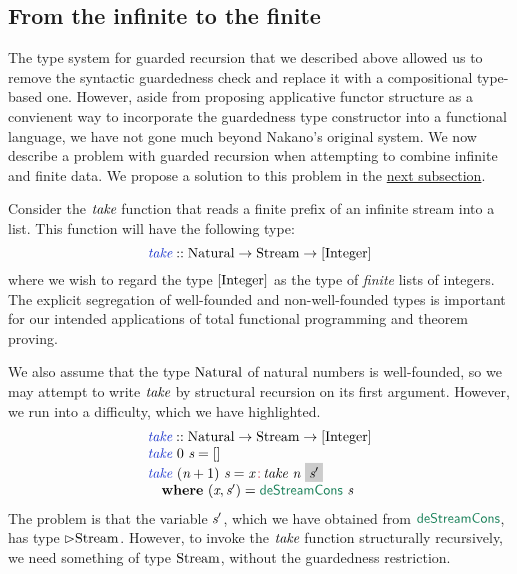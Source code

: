 \subsection{From the infinite to the finite}
\label{sec:infinite-to-finite}

The type system for guarded recursion that we described above allowed
us to remove the syntactic guardedness check and replace it with a
compositional type-based one. However, aside from proposing
applicative functor structure as a convienent way to incorporate the
guardedness type constructor into a functional language, we have not
gone much beyond Nakano's original system. We now describe a problem
with guarded recursion when attempting to combine infinite and finite
data. We propose a solution to this problem in the
\hyperref[sec:clock-vars]{next subsection}.

Consider the $\textit{take}$ function that reads a finite prefix of an
infinite stream into a list. This function will have the following type:
\begin{displaymath}
  \defn{take} :: \tyname{Natural} \to \tyname{Stream} \to [\tyname{Integer}]
\end{displaymath}
where we wish to regard the type $[\textrm{Integer}]$ as the type of
\emph{finite} lists of integers. The explicit segregation of
well-founded and non-well-founded types is important for our intended
applications of total functional programming and theorem proving.

We also assume that the type $\textrm{Natural}$ of natural numbers is
well-founded, so we may attempt to write $\textit{take}$ by structural
recursion on its first argument. However, we run into a difficulty,
which we have \colorbox{greybg}{highlighted}.
\begin{displaymath}
  \begin{array}{l}
    \defn{take} :: \tyname{Natural} \to \tyname{Stream} \to [\tyname{Integer}] \\
    \defn{take}\ 0\ \ident{s} = [] \\
    \defn{take}\ (\ident{n}+1)\ \ident{s} = \ident{x} \mathop{\cons{:}} \ident{take}\ \ident{n}\ \colorbox{greybg}{$\ident{s$'$}$} \\
    \quad \kw{where}\ (\ident{x}, \ident{s$'$}) = \elim{deStreamCons}\ \ident{s}
  \end{array}
\end{displaymath}
The problem is that the variable $\textit{s$'$}$, which we have obtained
from $\elim{deStreamCons}$, has type $\rhd\textrm{Stream}$. However,
to invoke the $\textit{take}$ function structurally recursively, we
need something of type $\textrm{Stream}$, without the guardedness
restriction.

